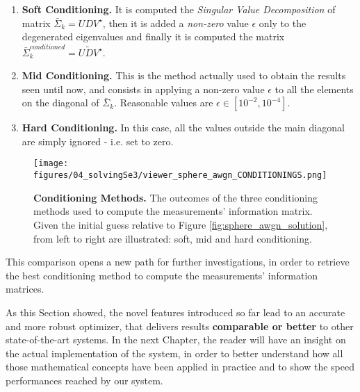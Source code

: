 \begin{enumerate}
    \item \textbf{Soft Conditioning.} It is computed the \textit{Singular Value Decomposition} of matrix $\bar{\Sigma}_k = UDV^\star$, then it is added a \textit{non-zero} value $\epsilon$ only to the degenerated eigenvalues and finally it is computed the matrix $\bar{\Sigma}_k^{conditioned} = U\tilde{D}V^\star$.
    \item \textbf{Mid Conditioning.} This is the method actually used to obtain the results seen until now, and consists in applying a non-zero value $\epsilon$ to all the elements on the diagonal of $\bar{\Sigma}_k$. Reasonable values are $\epsilon \in [10^{-2}, 10^{-4}]$.
    \item \textbf{Hard Conditioning.} In this case, all the values outside the main diagonal are simply ignored - i.e. set to zero. 
\end{enumerate}

\begin{figure}[!hbt]
    \centering    
    \texttt{[image: figures/04\_solvingSe3/viewer\_sphere\_awgn\_CONDITIONINGS.png]}
    \caption{\textbf{Conditioning Methods.} The outcomes of the three conditioning methods used to compute the measurements' information matrix. Given the initial guess relative to Figure \ref{fig:sphere_awgn_solution}, from left to right are illustrated: soft, mid and hard conditioning.}
    \label{fig:sphere_conditionings}
\end{figure}

This comparison opens a new path for further investigations, in order to retrieve the best conditioning method to compute the measurements' information matrices.

\vspace{15px}

As this Section showed, the novel features introduced so far lead to an accurate and more robust optimizer, that delivers results \textbf{comparable or better} to other state-of-the-art systems. In the next Chapter, the reader will have an insight on the actual implementation of the system, in order to better understand how all those mathematical concepts have been applied in practice and to show the speed performances reached by our system.